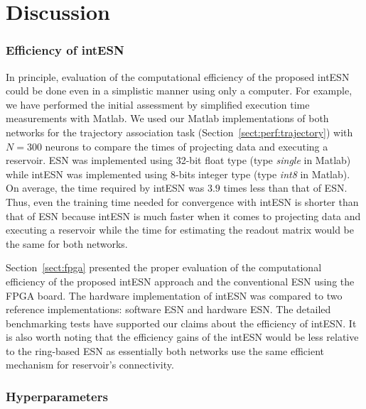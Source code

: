
\section{Discussion}
\label{sect:dis}


\subsubsection{Efficiency of intESN}
In principle, evaluation of the computational efficiency of the proposed intESN could be done even in a simplistic manner using only a computer.
For example, we have performed the initial assessment by simplified execution time measurements with Matlab.
We used our Matlab implementations of both networks for the trajectory association task (Section~\ref{sect:perf:trajectory}) with $N=300$ neurons to compare the times of projecting data and executing a reservoir. ESN was implemented using 32-bit float type (type \textit{single} in Matlab) while intESN was implemented using 8-bits integer type (type \textit{int8} in Matlab).
On average, the time required by intESN was $3.9$ times less than that of ESN.
Thus, even the training time needed for convergence with intESN is shorter than that of ESN because intESN is much faster when it comes to projecting data and executing a reservoir while the time for estimating the readout matrix would be the same for both networks. 

Section~\ref{sect:fpga} presented the proper evaluation of the computational efficiency of the proposed intESN approach and the conventional ESN using the FPGA board. The hardware implementation of intESN was compared to two reference implementations: software ESN and hardware ESN. 
The detailed benchmarking tests have supported our claims about the efficiency of intESN. 
It is also worth noting that the efficiency gains of the intESN would be less relative to the ring-based ESN as essentially both networks use the same efficient mechanism for reservoir's connectivity. 






\subsubsection{Hyperparameters}

